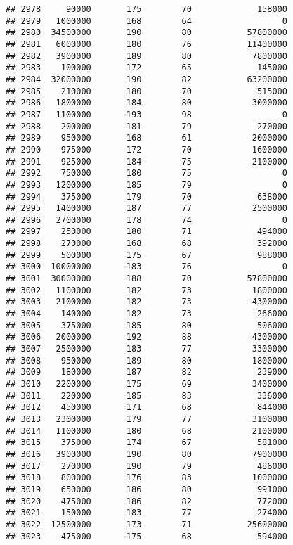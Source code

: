 \documentclass[
]{article}
\begin{document}
\begin{verbatim}
## 2978     90000       175        70             158000
## 2979   1000000       168        64                  0
## 2980  34500000       190        80           57800000
## 2981   6000000       180        76           11400000
## 2982   3900000       189        80            7800000
## 2983    100000       172        65             145000
## 2984  32000000       190        82           63200000
## 2985    210000       180        70             515000
## 2986   1800000       184        80            3000000
## 2987   1100000       193        98                  0
## 2988    200000       181        79             270000
## 2989    950000       168        61            2000000
## 2990    975000       172        70            1600000
## 2991    925000       184        75            2100000
## 2992    750000       180        75                  0
## 2993   1200000       185        79                  0
## 2994    375000       179        70             638000
## 2995   1400000       187        77            2500000
## 2996   2700000       178        74                  0
## 2997    250000       180        71             494000
## 2998    270000       168        68             392000
## 2999    500000       175        67             988000
## 3000  10000000       183        76                  0
## 3001  30000000       188        70           57800000
## 3002   1100000       182        73            1800000
## 3003   2100000       182        73            4300000
## 3004    140000       182        73             266000
## 3005    375000       185        80             506000
## 3006   2000000       192        88            4300000
## 3007   2500000       183        77            3300000
## 3008    950000       189        80            1800000
## 3009    180000       187        82             239000
## 3010   2200000       175        69            3400000
## 3011    220000       185        83             336000
## 3012    450000       171        68             844000
## 3013   2300000       179        77            3100000
## 3014   1100000       180        68            2100000
## 3015    375000       174        67             581000
## 3016   3900000       190        80            7900000
## 3017    270000       190        79             486000
## 3018    800000       176        83            1000000
## 3019    650000       186        80             991000
## 3020    475000       186        82             772000
## 3021    150000       183        77             274000
## 3022  12500000       173        71           25600000
## 3023    475000       175        68             594000

\end{verbatim}
\end{document}
